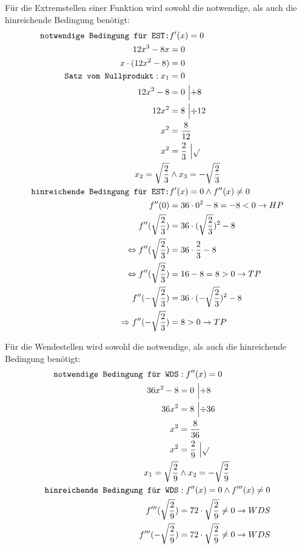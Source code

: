 \documentclass[12pt,a4paper]{report}
\newenvironment{gblock}[1]{
    \tcolorbox[beamer,
        noparskip,
        colback=green!50!,
        colbacklower=green!75!green,
        title=#1]}
{\endtcolorbox}
\begin{document}
	\begin{gblock}{Extremstellen}
		Für die Extremstellen einer Funktion wird sowohl die notwendige, als auch die hinreichende Bedingung benötigt:
		\begin{align*}
			\texttt{notwendige Bedingung für EST:}& f'(x) = 0 \\
			12x^3 - 8x &= 0 \\
			x \cdot (12x^2 - 8) &= 0 \\
			\texttt{Satz vom Nullprodukt}: x_1 &= 0 \\
			12x^2 - 8 &= 0\ \Bigl|+8\\
			12x^2 &= 8\ \Bigl|\div 12\\
			x^2 &= \frac{8}{12} \\
			x^2 &= \frac{2}{3}\ \Bigl|\sqrt{} \\
			x_2 = \sqrt{\frac{2}{3}} &\land x_3 = -\sqrt{\frac{2}{3}} \\
			\texttt{hinreichende Bedingung für EST:}& f'(x) = 0 \land f''(x) \ne 0 \\
			f''(0) &= 36 \cdot 0^2 - 8 = -8 < 0 \to HP \\
			f''(\sqrt{\frac{2}{3}}) &= 36 \cdot (\sqrt{\frac{2}{3}})^2 - 8 \\
			\Leftrightarrow f''(\sqrt{\frac{2}{3}}) &=36\cdot \frac{2}{3} - 8 \\
			\Leftrightarrow f''(\sqrt{\frac{2}{3}}) &= 16-8 = 8 > 0 \to TP \\
			f''(-\sqrt{\frac{2}{3}}) &= 36 \cdot (-\sqrt{\frac{2}{3}})^2 - 8 \\
			\Rightarrow f''(-\sqrt{\frac{2}{3}}) &= 8 > 0 \to TP
		\end{align*}
	\end{gblock}
	
	\begin{gblock}{Wendestellen}
		Für die Wendestellen wird sowohl die notwendige, als auch die hinreichende Bedingung benötigt:
		\begin{align*}
			\texttt{notwendige Bedingung für WDS}&: f''(x) = 0 \\
			36x^2 - 8 &= 0\ \Bigl|+8 \\
			36x^2 &= 8\ \Bigl|\div 36\\
			x^2 &= \frac{8}{36}\\
			x^2 &= \frac{2}{9}\ \Bigl|\sqrt{} \\
			x_1 = \sqrt{\frac{2}{9}} &\land x_2 = -\sqrt{\frac{2}{9}} \\
			\texttt{hinreichende Bedingung für WDS}&: f''(x) = 0 \land f'''(x) \ne 0 \\
			f'''(\sqrt{\frac{2}{9}}) &= 72 \cdot \sqrt{\frac{2}{9}} \ne 0 \to WDS \\
			f'''(-\sqrt{\frac{2}{9}}) &= 72 \cdot \sqrt{\frac{2}{9}} \ne 0 \to WDS \\
		\end{align*}
	\end{gblock}
	
\end{document}

